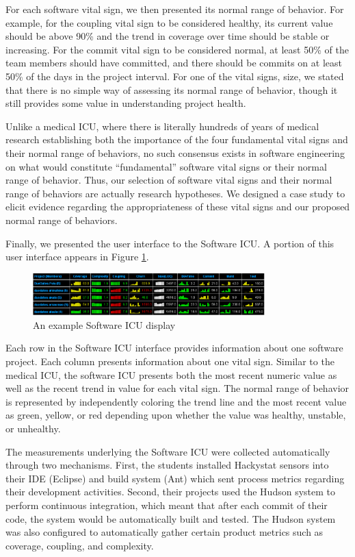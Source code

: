 For each software vital sign, we then presented its normal range of
behavior.  For example, for the coupling vital sign to be considered
healthy, its current value should be above 90\% and the trend in
coverage over time should be stable or increasing.  For the commit vital
sign to be considered normal, at least 50\% of the team members should have
committed, and there should be commits on at least 50\% of the days in the
project interval.  For one of the vital signs, size, we stated that
there is no simple way of assessing its normal range of behavior, though
it still provides some value in understanding project health.

Unlike a medical ICU, where there is literally hundreds of years of medical
research establishing both the importance of the four fundamental vital
signs and their normal range of behaviors, no such consensus exists in
software engineering on what would constitute ``fundamental'' software
vital signs or their normal range of behavior.  Thus, our selection of
software vital signs and their normal range of behaviors are actually
research hypotheses.  We designed a case study to elicit evidence
regarding the appropriateness of these vital signs and our proposed normal
range of behaviors.

Finally, we presented the user interface to the Software ICU. A portion of
this user interface appears in Figure \ref{fig:sicu}.

\begin{figure}[ht]
  \center
  \includegraphics[width=0.8\textwidth]{portfolio-2008.eps}
  \caption{An example Software ICU display}
  \label{fig:sicu}
\end{figure} 

Each row in the Software ICU interface provides information about one
software project.  Each column presents information about one vital
sign. Similar to the medical ICU, the software ICU presents both the most
recent numeric value as well as the recent trend in value for each vital
sign.  The normal range of behavior is represented by independently
coloring the trend line and the most recent value as green, yellow, or red
depending upon whether the value was healthy, unstable, or unhealthy.

The measurements underlying the Software ICU were collected automatically
through two mechanisms. First, the students installed Hackystat sensors
into their IDE (Eclipse) and build system (Ant) which sent process
metrics regarding their development activities.  Second, their projects
used the Hudson system to perform continuous integration, which meant that
after each commit of their code, the system would be automatically built
and tested.  The Hudson system was also configured to automatically gather
certain product metrics such as coverage, coupling, and complexity.

